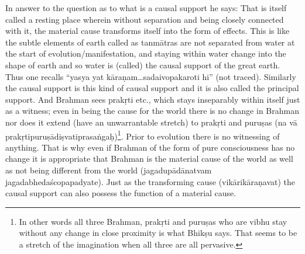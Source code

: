 
In answer to the question as to what is a causal support he says: That is itself called a resting place wherein without separation and being closely connected with it, the material cause transforms itself into the form of effects. This is like the subtle elements of earth called as tanmātras are not separated from water at the start of evolution/manifestation, and staying within water change into the shape of earth and so water is (called) the causal support of the great earth. Thus one recalls “yasya yat kāraṇam…sadaivopakaroti hi” (not traced). Similarly the causal support is this kind of causal support and it is also called the principal support. And Brahman sees prakṛti etc., which stays inseparably within itself just as a witness; even in being the cause for the world there is no change in Brahman nor does it extend (have an unwarrantable stretch) to prakṛti and puruṣas (na vā prakṛtipuruṣādiṣvatiprasaṅgaḥ)\footnote{In other words all three Brahman, prakṛti and puruṣas who are vibhu stay without any change in close proximity is what Bhikṣu says. That seems to be a stretch of the imagination when all three are all pervasive.}. Prior to evolution there is no witnessing of anything. That is why even if Brahman of the form of pure consciousness has no change it is appropriate that Brahman is the material cause of the world as well as not being different from the world (jagadupādānatvam jagadabhedaścopapadyate). Just as the transforming cause (vikārikāraṇavat) the causal support can also possess the function of a material cause.  

